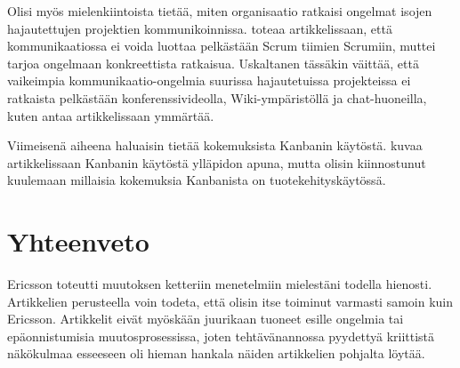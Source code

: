 \documentclass[a4paper]{article}
\begin{document}
Olisi myös mielenkiintoista tietää, miten organisaatio ratkaisi ongelmat isojen hajautettujen projektien kommunikoinnissa. \citet{mikkonen2011} toteaa artikkelissaan, että kommunikaatiossa ei voida luottaa pelkästään Scrum tiimien Scrumiin, muttei tarjoa ongelmaan konkreettista ratkaisua. Uskaltanen tässäkin väittää, että vaikeimpia kommunikaatio-ongelmia suurissa hajautetuissa projekteissa ei ratkaista pelkästään konferenssivideolla, Wiki-ympäristöllä ja chat-huoneilla, kuten \citet{hallikainen2012} antaa artikkelissaan ymmärtää.

Viimeisenä aiheena haluaisin tietää kokemuksista Kanbanin käytöstä. \citet{seikola} kuvaa artikkelissaan Kanbanin käytöstä ylläpidon apuna, mutta olisin kiinnostunut kuulemaan millaisia kokemuksia Kanbanista on tuotekehityskäytössä.

\section{Yhteenveto}

Ericsson toteutti muutoksen ketteriin menetelmiin mielestäni todella hienosti. Artikkelien perusteella voin todeta, että olisin itse toiminut varmasti samoin kuin Ericsson. Artikkelit eivät myöskään juurikaan tuoneet esille ongelmia tai epäonnistumisia muutosprosessissa, joten tehtävänannossa pyydettyä kriittistä näkökulmaa esseeseen oli hieman hankala näiden artikkelien pohjalta löytää.




\end{document}

